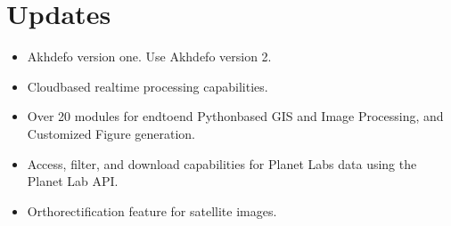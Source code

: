 \documentclass[letterpaper,10pt,english]{sphinxmanual}
\begin{document}
\section{Updates}
\label{\detokenize{README:updates}}\begin{itemize}
\item {} 
\sphinxAtStartPar
{} Akhdefo version one.  Use Akhdefo version 2.

\item {} 
\sphinxAtStartPar
{} Cloud\sphinxhyphen{}based real\sphinxhyphen{}time processing capabilities.

\item {} 
\sphinxAtStartPar
{} Over 20 modules for end\sphinxhyphen{}to\sphinxhyphen{}end Python\sphinxhyphen{}based GIS and Image Processing, and Customized Figure generation.

\item {} 
\sphinxAtStartPar
{} Access, filter, and download capabilities for Planet Labs data using the Planet Lab API.

\item {} 
\sphinxAtStartPar
{} Orthorectification feature for satellite images.

\end{itemize}
\end{document}
